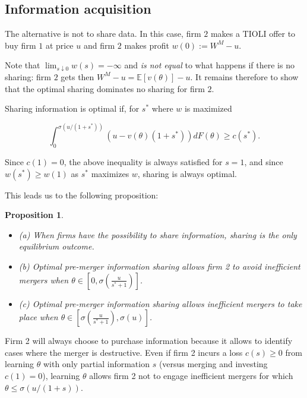 \documentclass[a4paper,leqno]{article}%
\newtheorem{prop}{Proposition}
\newcommand{\E}{\mathbb E}
\renewcommand{\t}{\theta}
\newcommand{\s}{\sigma}
\begin{document}
\medskip

\subsection{Information acquisition}

The alternative is not to share data. In this case, firm $2$ makes a TIOLI offer to buy firm $1$ at price $u$ and firm $2$ makes profit $w(0):=W^M-u$.

\medskip

Note that $\lim_{s\downarrow 0}w(s)=-\infty$ and \emph{is not equal } to what happens if there is no sharing: firm $2$ gets then $W^M-u=\E[v(\t)]-u$. It remains therefore to show that the optimal sharing dominates no sharing for firm $2$. 

\medskip

Sharing information is optimal if, for $s^*$ where $w$ is maximized

\[
\int_{0}^{\s(u/(1+s^*))}(u-v(\t)(1+s^*))dF(\t)\geq c(s^*).
\]

Since $c(1)=0$, the above inequality is always satisfied for $s=1$, and since $w(s^*)\geq w(1)$ as $s^*$ maximizes $w$, sharing is always optimal.



This leads us to the following proposition:

\begin{prop}~~\label{prop:1}

\begin{itemize}
    \item (a) When firms have the possibility to share information, sharing is the only equilibrium outcome.
    \item (b) Optimal pre-merger information sharing allows firm 2 to avoid inefficient mergers when $\t\in\left[0,\s(\frac{u}{s^*+1})\right]$.
    \item (c) Optimal pre-merger information sharing allows inefficient mergers to take place when $\t\in\left[\s(\frac{u}{s^*+1}),\s(u)\right]$.
\end{itemize} 

\end{prop}

\medskip

Firm 2 will always choose to purchase information because it allows to identify cases where the merger is destructive. Even if firm 2 incurs a loss $c(s)\geq 0$ from learning $\t$ with only partial information $s$ (versus merging and investing $c(1)=0$), learning $\t$ allows firm 2 not to engage inefficient mergers for which $\t\leq \s(u/(1+s))$. 
\end{document}
